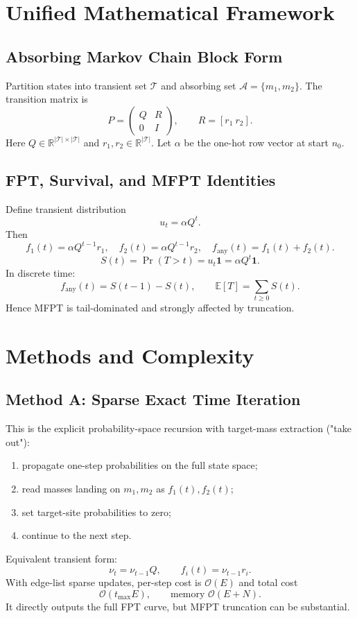\documentclass[11pt,a4paper]{article}
\begin{document}
\section{Unified Mathematical Framework}
\subsection{Absorbing Markov Chain Block Form}
Partition states into transient set $\mathcal T$ and absorbing set $\mathcal A=\{m_1,m_2\}$. The transition matrix is
\[
P=
\begin{pmatrix}
Q & R\\
0 & I
\end{pmatrix},\qquad
R=[r_1\ r_2].
\]
Here $Q\in\mathbb R^{|\mathcal T|\times|\mathcal T|}$ and $r_1,r_2\in\mathbb R^{|\mathcal T|}$. Let $\alpha$ be the one-hot row vector at start $n_0$.

\subsection{FPT, Survival, and MFPT Identities}
Define transient distribution
\[
u_t=\alpha Q^t.
\]
Then
\[
 f_1(t)=\alpha Q^{t-1}r_1,\quad
 f_2(t)=\alpha Q^{t-1}r_2,\quad
 f_{\mathrm{any}}(t)=f_1(t)+f_2(t).
\]
\[
S(t)=\Pr(T>t)=u_t\mathbf 1=\alpha Q^t\mathbf 1.
\]
In discrete time:
\[
 f_{\mathrm{any}}(t)=S(t-1)-S(t),\qquad
 \mathbb E[T]=\sum_{t\ge0} S(t).
\]
Hence MFPT is tail-dominated and strongly affected by truncation.

\section{Methods and Complexity}
\subsection{Method A: Sparse Exact Time Iteration}
This is the explicit probability-space recursion with target-mass extraction ("take out"):
\begin{enumerate}[leftmargin=2em]
  \item propagate one-step probabilities on the full state space;
  \item read masses landing on $m_1,m_2$ as $f_1(t),f_2(t)$;
  \item set target-site probabilities to zero;
  \item continue to the next step.
\end{enumerate}
Equivalent transient form:
\[
\nu_t=\nu_{t-1}Q,\qquad f_i(t)=\nu_{t-1}r_i.
\]
With edge-list sparse updates, per-step cost is $\mathcal O(E)$ and total cost
\[
\mathcal O(t_{\max}E),\qquad \text{memory } \mathcal O(E+N).
\]
It directly outputs the full FPT curve, but MFPT truncation can be substantial.
\end{document}
